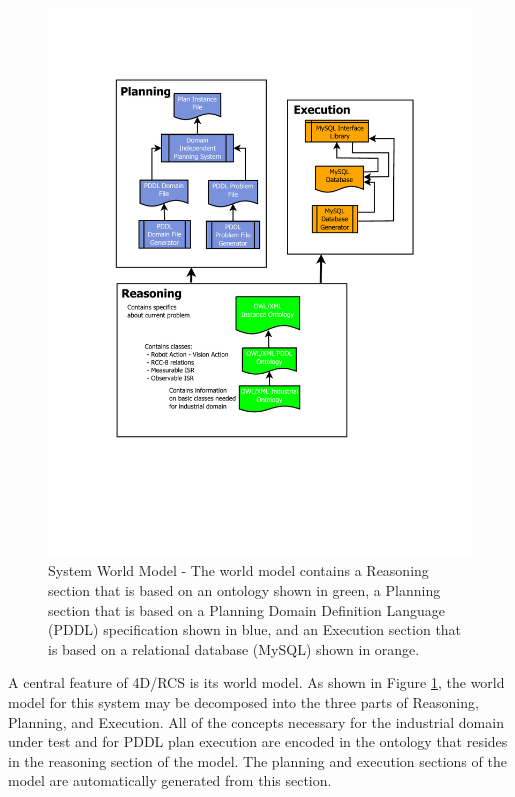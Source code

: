 \begin{figure}[htb!]
\begin{center}
\includegraphics[width=12cm]{images/WorldModel.pdf}
\caption{System World Model - The world model contains a Reasoning section that is based on an ontology shown in green,
a Planning section that is based on a Planning Domain Definition Language (PDDL) specification shown in blue, and an Execution section that is based on a relational database (MySQL) shown in orange.}
\label{fig:WorldModel}
\end{center}
\end{figure}
%
A central feature of 4D/RCS is its world model. As shown in Figure \ref{fig:WorldModel},
the world model for this system may be decomposed into the three parts of
Reasoning, Planning, and Execution. All of the concepts necessary for the industrial
domain under test and for PDDL plan execution are encoded in the ontology that resides in the reasoning section of the model. The planning and execution sections of the model are automatically generated from this section.
%
